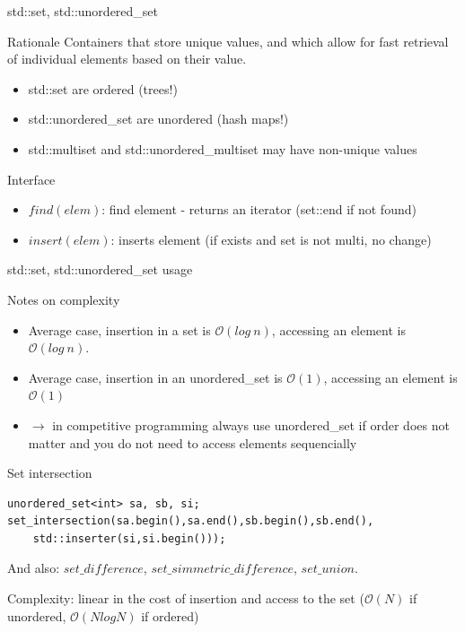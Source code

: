 \documentclass{beamer}
\begin{document}
\begin{frame}{std::set, std::unordered\_set}
\begin{block}{Rationale}
Containers that store unique values, and which allow for fast retrieval of individual elements based on their value.
\begin{itemize}
\item std::set are ordered (trees!)
\item std::unordered\_set are unordered (hash maps!)
\item std::multiset and std::unordered\_multiset may have non-unique values
\end{itemize}
\end{block}

\begin{block}{Interface}
\begin{itemize}
\item $find(elem)$: find element - returns an iterator (set::end if not found)
\item $insert(elem)$: inserts element (if exists and set is not multi, no change)
\end{itemize}
\end{block}
\end{frame}

\begin{frame}[fragile]{std::set, std::unordered\_set usage}
\begin{block}{Notes on complexity}
\begin{itemize}
\item Average case, insertion in a set is $\mathcal{O}(log~n)$, accessing an element is $\mathcal{O}(log~n)$.
\item Average case, insertion in an unordered\_set is $\mathcal{O}(1)$, accessing an element is $\mathcal{O}(1)$
\item $\to$ in competitive programming always use unordered\_set if order does not matter and you do not need to access elements sequencially
\end{itemize}
\end{block}
\begin{block}{Set intersection}
\begin{lstlisting}
unordered_set<int> sa, sb, si;
set_intersection(sa.begin(),sa.end(),sb.begin(),sb.end(),
	std::inserter(si,si.begin()));
\end{lstlisting}

And also: $set\_difference$, $set\_simmetric\_difference$, $set\_union$.

Complexity: linear in the cost of insertion and access to the set ($\mathcal{O}(N)$ if unordered, $\mathcal{O}(N log N)$ if ordered)
\end{block}
\end{frame}
\end{document}
